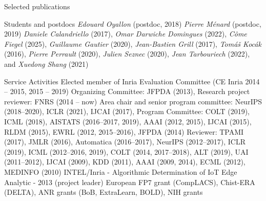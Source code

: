 \documentclass{resume}
\begin{document}
\begin{category}{Selected publications}



  

\end{category}
\vspace{-0.5cm}
\begin{category}{Students and postdocs}
\citemnobullet 
\textit{Edouard Oyallon} (postdoc, 2018)
\textit{Pierre M\'enard} (postdoc, 2019)
\textit{Daniele Calandriello} (2017), 
\textit{Omar Darwiche Domingues} (2022), 
\textit{C\^{o}me Fiegel} (2025),
\textit{Guillaume Gautier} (2020),
\textit{Jean-Bastien Grill} (2017), 
\textit{Tom\'a\v s Koc\' ak} (2016),
\textit{Pierre Perrault} (2020), 
\textit{Julien Seznec} (2020), 
\textit{Jean Tarbouriech} (2022), and
\textit{Xuedong Shang} (2021) 
\end{category}
\vspace{-0.5cm}
\begin{category}{Service Activities}
\setlength\itemsep{0.15em}
\citembullet Elected member of Inria Evaluation Committee (CE Inria 2014 -- 2015, 2015 -- 2019)
\citembullet Organizing Committee: JFPDA (2013),  Research project reviewer: FNRS (2014 -- now)
\citembullet Area chair and senior program committee: NeurIPS (2018--2020), ICLR (2021),  IJCAI (2017), Program Committee: COLT (2019), ICML (2018), AISTATS (2016--2017, 2019), AAAI (2012, 2015), IJCAI (2015), RLDM (2015), EWRL 
(2012, 2015--2016), JFPDA (2014)
\citembullet  Reviewer: TPAMI (2017), JMLR (2016), Automatica (2016--2017), NeurIPS (2012--2017), ICLR (2019), ICML (2012--2016, 2019), COLT
(2014, 2017--2018), ALT (2019), UAI (2011--2012), IJCAI (2009), KDD (2011), AAAI (2009, 2014), ECML
(2012), MEDINFO (2010)
\citembullet INTEL/Inria - Algorithmic Determination of IoT Edge Analytic -
2013 (project leader)
\citembullet  European FP7 grant (CompLACS), Chist-ERA (DELTA), ANR grants (BoB, ExtraLearn, BOLD), NIH grants
\end{category}
\end{document}
